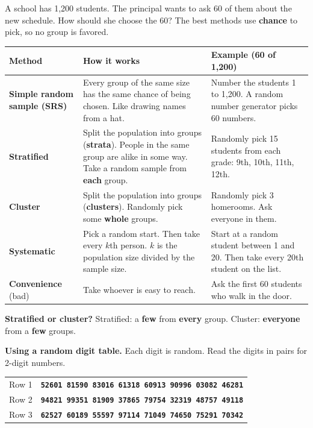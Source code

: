 \documentclass[11pt]{article}
\begin{document}

A school has 1,200 students. The principal wants to ask 60 of them about the new schedule.
How should she choose the 60? The best methods use \textbf{chance} to pick, so no group is favored.

\vspace{0.6em}
\renewcommand{\arraystretch}{1.3}
\begin{tabular}{|>{\raggedright\arraybackslash}p{1.25in}|>{\raggedright\arraybackslash}p{2.7in}|>{\raggedright\arraybackslash}p{2.45in}|}\hline
\textbf{Method} & \textbf{How it works} & \textbf{Example (60 of 1,200)}\\ \hline
\textbf{Simple random sample (SRS)} & Every group of the same size has the same chance of being chosen. Like drawing names from a hat. & Number the students 1 to 1,200. A random number generator picks 60 numbers.\\ \hline
\textbf{Stratified} & Split the population into groups (\textbf{strata}). People in the same group are alike in some way. Take a random sample from \textbf{each} group. & Randomly pick 15 students from each grade: 9th, 10th, 11th, 12th.\\ \hline
\textbf{Cluster} & Split the population into groups (\textbf{clusters}). Randomly pick some \textbf{whole} groups. & Randomly pick 3 homerooms. Ask everyone in them.\\ \hline
\textbf{Systematic} & Pick a random start. Then take every $k$th person. $k$ is the population size divided by the sample size. & Start at a random student between 1 and 20. Then take every 20th student on the list.\\ \hline
\textbf{Convenience} (bad) & Take whoever is easy to reach. & Ask the first 60 students who walk in the door.\\ \hline
\end{tabular}

\vspace{0.6em}
\textbf{Stratified or cluster?} \; Stratified: a \textbf{few} from \textbf{every} group. \; Cluster: \textbf{everyone} from a \textbf{few} groups.

\vspace{0.8em}
\textbf{Using a random digit table.} Each digit is random. Read the digits in pairs for 2-digit numbers.

\vspace{0.3em}
\begin{center}
\renewcommand{\arraystretch}{1.3}\large
\begin{tabular}{|l|l|}\hline
Row 1 & \texttt{\bfseries 52601 81590 83016 61318 60913 90996 03082 46281}\\
Row 2 & \texttt{\bfseries 94821 99351 81909 37865 79754 32319 48757 49118}\\
Row 3 & \texttt{\bfseries 62527 60189 55597 97114 71049 74650 75291 70342}\\ \hline
\end{tabular}
\end{center}
\end{document}
